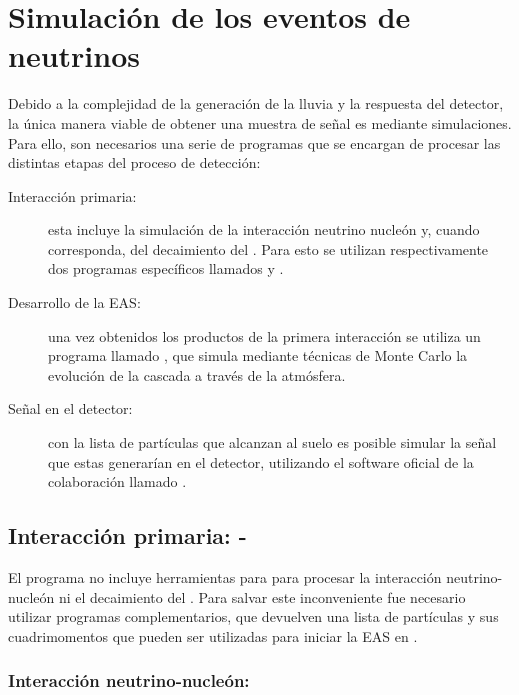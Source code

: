 \chapter{Simulación de los eventos de neutrinos}
\label{ch:simulacionAuger}

Debido a la complejidad de la generación de la lluvia y la respuesta del detector, la \'unica manera viable de obtener una muestra de señal es mediante simulaciones.
Para ello, son necesarios una serie de programas que se encargan de procesar las distintas etapas del proceso de detecci\'on:
\begin{description}
 \item[Interacción primaria:] esta incluye la simulaci\'on de la interacción neutrino nucleón y, cuando corresponda, del decaimiento del \tauon{}. 
 Para esto se utilizan respectivamente dos programas específicos llamados \herwig{} y \tauola{}.
 \item[Desarrollo de la EAS:] una vez obtenidos los productos de la primera interacción se utiliza un programa llamado \aires{}, que simula mediante t\'ecnicas de Monte Carlo la evolución de la cascada a través de la atmósfera.
 \item[Señal en el detector:] con la lista de partículas que alcanzan al suelo es posible simular la señal que estas generarían en el detector, utilizando el software oficial de la colaboración llamado \Offline{}.
\end{description}

	\section{Interacción primaria: \herwig{} - \tauola{}}
	
	El programa \aires{} no incluye herramientas para para procesar la interacción neutrino-nucleón ni el decaimiento del \tauon{}.
	Para salvar este inconveniente fue necesario utilizar programas complementarios, que devuelven una lista de partículas y sus cuadrimomentos que pueden ser utilizadas para iniciar la EAS en \aires.
	
	\subsection{Interacción neutrino-nucleón: \herwig{}}
	
